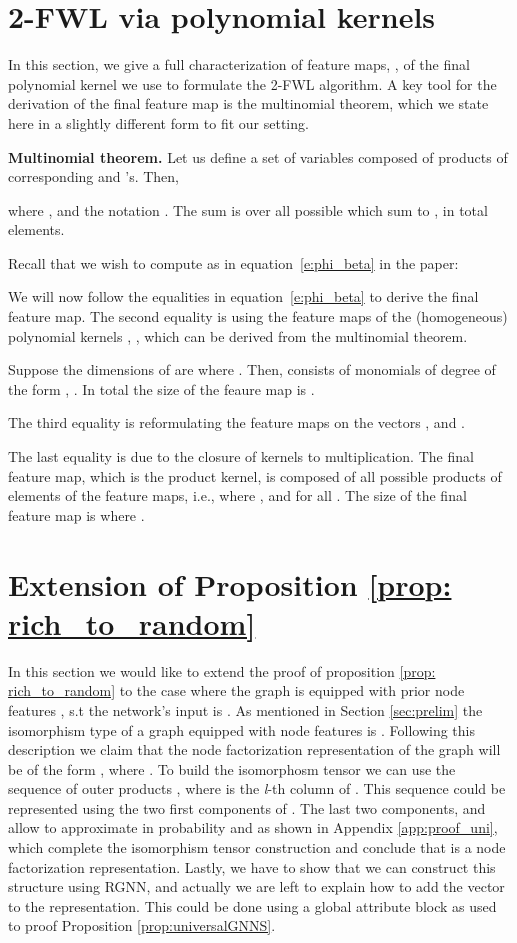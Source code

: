 \documentclass{article} \usepackage{iclr2021_conference,times}
\newcommand{\ie}{{i.e.}}
\def\eqref#1{equation~\ref{#1}}
\begin{document}
\section{2-FWL via polynomial kernels}\label{app:feat_map_monomial}
In this section, we give a full characterization of feature maps, , of the final polynomial kernel we use to formulate the 2-FWL algorithm. 
A key tool for the derivation of the final feature map is the multinomial theorem, which we state here in a slightly different form to fit our setting. 

\textbf{Multinomial theorem. } Let us define a set of  variables  composed of products of corresponding  and 's. Then,

where , and the notation . The sum is over all possible  which sum to , in total  elements.

Recall that we wish to compute  as in \eqref{e:phi_beta} in the paper:



We will now follow the equalities in \eqref{e:phi_beta} to derive the final feature map. The second equality is using the feature maps  of the (homogeneous) polynomial kernels \citep{Vapnik1998}, , which can be derived from the multinomial theorem.

Suppose the dimensions of  are  where . Then,  consists of monomials of degree  of the form ,  . In total the size of the feaure map  is .

The third equality is reformulating the feature maps  on the vectors , and .


The last equality is due to the closure of kernels to multiplication. The final feature map, which is the product kernel, is composed of all possible products of elements of the feature maps, \ie,  
where , and  for all . 
The size of the final feature map is  where .


\section{Extension of Proposition \ref{prop: rich_to_random}}\label{app: extension_prop_4}
In this section we would like to extend the proof of proposition \ref{prop: rich_to_random} to the case where the graph is equipped with prior node features , s.t the network's input is . As mentioned in Section \ref{sec:prelim} the isomorphism type of a graph equipped with node features is . Following this description we claim that the node factorization representation of the graph will be of the form , where . To build the isomorphosm tensor we can use the sequence of outer products , where  is the \textit{l}-th column of . This sequence could be represented using the two first components of .
The last two components,  and  allow to approximate in probability  and  as shown in Appendix \ref{app:proof_uni}, which complete the isomorphism tensor construction and conclude that  is a node factorization representation. Lastly, we have to show that we can construct this structure using RGNN, and actually we are left to explain how to add the  vector to the representation. This could be done using a global attribute block as used to proof Proposition \ref{prop:universalGNNS}.
\end{document}
